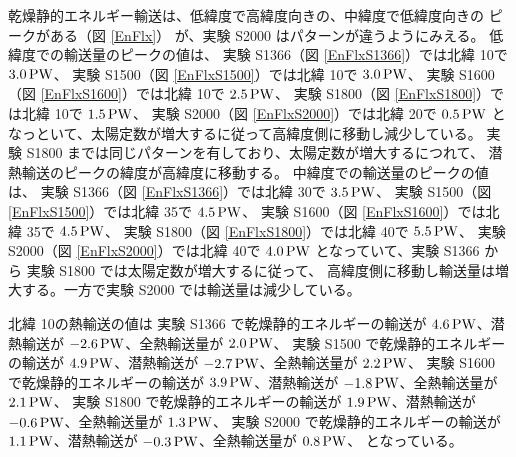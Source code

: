 \documentclass[body]{subfiles}
\begin{document}
乾燥静的エネルギー輸送は、低緯度で高緯度向きの、中緯度で低緯度向きの
ピークがある（図 \ref{EnFlx}）
が、実験 S2000 はパターンが違うようにみえる。
低緯度での輸送量のピークの値は、
実験 S1366（図 \ref{EnFlxS1366}）では北緯 10\textdegree で \(3.0\hmu{PW}\)、
実験 S1500（図 \ref{EnFlxS1500}）では北緯 10\textdegree で \(3.0\hmu{PW}\)、
実験 S1600（図 \ref{EnFlxS1600}）では北緯 10\textdegree で \(2.5\hmu{PW}\)、
実験 S1800（図 \ref{EnFlxS1800}）では北緯 10\textdegree で \(1.5\hmu{PW}\)、
実験 S2000（図 \ref{EnFlxS2000}）では北緯 20\textdegree で \(0.5\hmu{PW}\)
となっといて、太陽定数が増大するに従って高緯度側に移動し減少している。
実験 S1800 までは同じパターンを有しており、太陽定数が増大するにつれて、
潜熱輸送のピークの緯度が高緯度に移動する。
中緯度での輸送量のピークの値は、
実験 S1366（図 \ref{EnFlxS1366}）では北緯 30\textdegree で \(3.5\hmu{PW}\)、
実験 S1500（図 \ref{EnFlxS1500}）では北緯 35\textdegree で \(4.5\hmu{PW}\)、
実験 S1600（図 \ref{EnFlxS1600}）では北緯 35\textdegree で \(4.5\hmu{PW}\)、
実験 S1800（図 \ref{EnFlxS1800}）では北緯 40\textdegree で \(5.5\hmu{PW}\)、
実験 S2000（図 \ref{EnFlxS2000}）では北緯 40\textdegree で \(4.0\hmu{PW}\)
となっていて、実験 S1366 から 実験 S1800 では太陽定数が増大するに従って、
高緯度側に移動し輸送量は増大する。一方で実験 S2000 では輸送量は減少している。

北緯 10\textdegree の熱輸送の値は
実験 S1366 で乾燥静的エネルギーの輸送が \(4.6\hmu{PW}\)、潜熱輸送が \(-2.6\hmu{PW}\)、全熱輸送量が \(2.0\hmu{PW}\)、
実験 S1500 で乾燥静的エネルギーの輸送が \(4.9\hmu{PW}\)、潜熱輸送が \(-2.7\hmu{PW}\)、全熱輸送量が \(2.2\hmu{PW}\)、
実験 S1600 で乾燥静的エネルギーの輸送が \(3.9\hmu{PW}\)、潜熱輸送が \(-1.8\hmu{PW}\)、全熱輸送量が \(2.1\hmu{PW}\)、
実験 S1800 で乾燥静的エネルギーの輸送が \(1.9\hmu{PW}\)、潜熱輸送が \(-0.6\hmu{PW}\)、全熱輸送量が \(1.3\hmu{PW}\)、
実験 S2000 で乾燥静的エネルギーの輸送が \(1.1\hmu{PW}\)、潜熱輸送が \(-0.3\hmu{PW}\)、全熱輸送量が \(0.8\hmu{PW}\)、
となっている。
\end{document}
